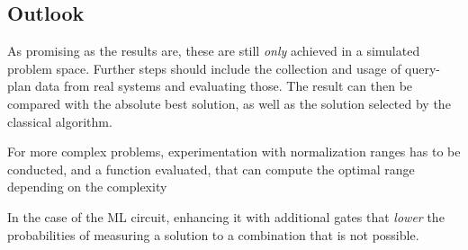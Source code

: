 \subsection{Outlook}
As promising as the results are, these are still \emph{only} achieved in a simulated problem space. Further steps should include the collection and usage of query-plan data from real systems and evaluating those. The result can then be compared with the absolute best solution, as well as the solution selected by the classical algorithm. \par
For more complex problems, experimentation with normalization ranges has to be conducted, and a function evaluated, that can compute the optimal range depending on the complexity\par
In the case of the ML circuit, enhancing it with additional gates that \emph{lower} the probabilities of measuring a solution to a combination that is not possible.

\newpage
